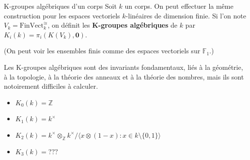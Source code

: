 \documentclass[12pt]{beamer}
\begin{document}
\begin{frame}{K-groupes algébriques d’un corps}
  Soit $k$ un corps. On peut effectuer la même construction pour les espaces vectoriels $k$-linéaires de dimension finie. Si l’on note $V_k=\mathrm{FinVect}_k^{\cong}$, on définit les \textbf{K-groupes algébriques} de $k$ par $K_i(k)=\pi_i (K(V_k),\mathbf{0})$.

(On peut voir les ensembles finis comme des espaces vectoriels sur $\mathbb{F}_1$.)

\pause
Les K-groupes algébriques sont des invariants fondamentaux, liés à la géométrie, à la topologie, à la théorie des anneaux et à la théorie des nombres, mais ils sont notoirement difficiles à calculer.
\pause
\begin{itemize}
  \item $K_0(k)=\mathbb{Z}$
  \item $K_1(k)=k^{\times}$
  \item $K_2(k)=k^{\times}\otimes_{\mathbb{Z}} k^{\times}/ \langle x\otimes (1-x): x\in k\setminus \{0,1\} \rangle$
    \pause
  \item $K_3(k)=???$
\end{itemize}
\end{frame}
\end{document}
